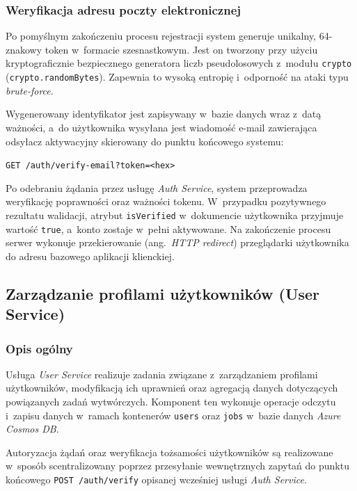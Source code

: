 \documentclass[a4paper,12pt,reqno]{article}
\begin{document}
\subsubsection{Weryfikacja adresu poczty elektronicznej}

Po pomyślnym zakończeniu procesu rejestracji system generuje unikalny, 64-znakowy token w~formacie szesnastkowym. Jest on tworzony przy użyciu kryptograficznie bezpiecznego generatora liczb pseudolosowych z~modułu \texttt{crypto} (\texttt{crypto.randomBytes}). Zapewnia to wysoką entropię i~odporność na ataki typu \textit{brute-force}.

Wygenerowany identyfikator jest zapisywany w~bazie danych wraz z~datą ważności, a~do użytkownika wysyłana jest wiadomość e-mail zawierająca odsyłacz aktywacyjny skierowany do punktu końcowego systemu:
\begin{center}
	\texttt{GET /auth/verify-email?token=<hex>}
\end{center}

\noindent Po odebraniu żądania przez usługę \textit{Auth Service}, system przeprowadza weryfikację poprawności oraz ważności tokenu. W~przypadku pozytywnego rezultatu walidacji, atrybut \texttt{isVerified} w~dokumencie użytkownika przyjmuje wartość \texttt{true}, a~konto zostaje w~pełni aktywowane. Na zakończenie procesu serwer wykonuje przekierowanie (ang.~\textit{HTTP redirect}) przeglądarki użytkownika do adresu bazowego aplikacji klienckiej.

\subsection{Zarządzanie profilami użytkowników (User Service)}

\subsubsection{Opis ogólny}

Usługa \textit{User Service} realizuje zadania związane z~zarządzaniem profilami użytkowników, modyfikacją ich uprawnień oraz agregacją danych dotyczących powiązanych zadań wytwórczych. Komponent ten wykonuje operacje odczytu i~zapisu danych w~ramach kontenerów \texttt{users} oraz \texttt{jobs} w~bazie danych \textit{Azure Cosmos DB}.

Autoryzacja żądań oraz weryfikacja tożsamości użytkowników są realizowane w~sposób scentralizowany poprzez przesyłanie wewnętrznych zapytań do punktu końcowego \texttt{POST /auth/verify} opisanej wcześniej usługi \textit{Auth Service}.
\end{document}
